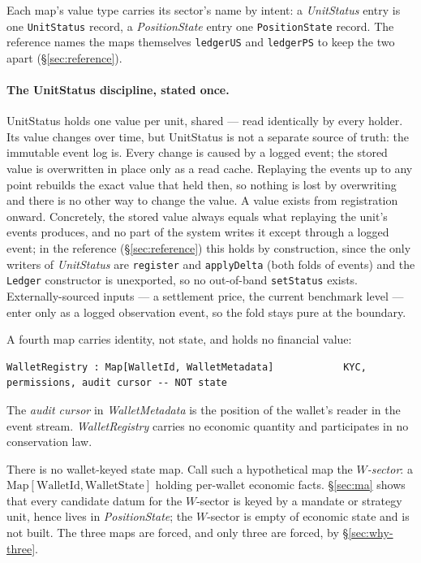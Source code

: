 \documentclass[11pt,a4paper]{article}
\begin{document}
\noindent Each map's value type carries its sector's name by intent: a \emph{UnitStatus}
entry is one \texttt{UnitStatus} record, a \emph{PositionState} entry one
\texttt{PositionState} record. The reference names the maps themselves \texttt{ledgerUS} and
\texttt{ledgerPS} to keep the two apart (\S\ref{sec:reference}).

\paragraph{The UnitStatus discipline, stated once.}
UnitStatus holds one value per unit, shared --- read identically by every holder. Its value
changes over time, but UnitStatus is not a separate source of truth: the immutable event log is.
Every change is caused by a logged event; the stored value is overwritten in place only as a read
cache. Replaying the events up to any point rebuilds the exact value that held then, so nothing is
lost by overwriting and there is no other way to change the value. A value exists from registration
onward. Concretely, the stored value always equals what replaying the unit's events produces, and
no part of the system writes it except through a logged event; in the reference
(\S\ref{sec:reference}) this holds by construction, since the only writers of \emph{UnitStatus} are
\texttt{register} and \texttt{applyDelta} (both folds of events) and the \texttt{Ledger}
constructor is unexported, so no out-of-band \texttt{setStatus} exists. Externally-sourced inputs
--- a settlement price, the current benchmark level --- enter only as a logged observation event,
so the fold stays pure at the boundary.

\noindent A fourth map carries identity, not state, and holds no financial value:

\begin{lstlisting}[language={}]
WalletRegistry : Map[WalletId, WalletMetadata]            KYC, permissions, audit cursor -- NOT state
\end{lstlisting}

\noindent The \emph{audit cursor} in \emph{WalletMetadata} is the position of the wallet's
reader in the event stream. \emph{WalletRegistry} carries no economic quantity and
participates in no conservation law.

There is no wallet-keyed state map. Call such a hypothetical map the \emph{$W$-sector}: a
$\mathrm{Map}[\mathrm{WalletId},\mathrm{WalletState}]$ holding per-wallet economic facts.
\S\ref{sec:ma} shows that every candidate datum for the $W$-sector is keyed by a mandate or
strategy unit, hence lives in \emph{PositionState}; the $W$-sector is empty of economic
state and is not built. The three maps are forced, and only three are forced, by
\S\ref{sec:why-three}.
\end{document}
